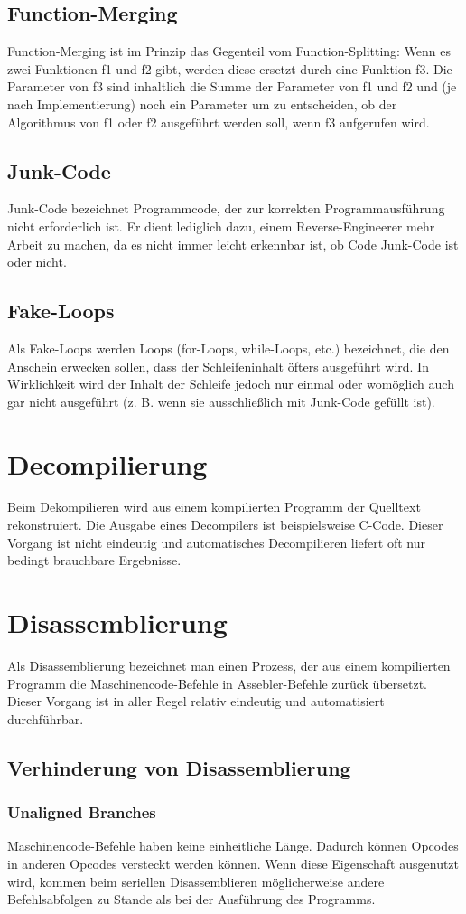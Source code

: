 \subsection{Function-Merging}
Function-Merging ist im Prinzip das Gegenteil vom Function-Splitting: Wenn es zwei Funktionen f1 und f2 gibt, werden diese ersetzt durch eine Funktion f3. Die Parameter von f3 sind inhaltlich die Summe der Parameter von f1 und f2 und (je nach Implementierung) noch ein Parameter um zu entscheiden, ob der Algorithmus von f1 oder f2 ausgeführt werden soll, wenn f3 aufgerufen wird.
\subsection{Junk-Code}
Junk-Code bezeichnet Programmcode, der zur korrekten Programmausführung nicht erforderlich ist. Er dient lediglich dazu, einem Reverse-Engineerer mehr Arbeit zu machen, da es nicht immer leicht erkennbar ist, ob Code Junk-Code ist oder nicht.
\subsection{Fake-Loops}
Als Fake-Loops werden Loops (for-Loops, while-Loops, etc.) bezeichnet, die den Anschein erwecken sollen, dass der Schleifeninhalt öfters ausgeführt wird. In Wirklichkeit wird der Inhalt der Schleife jedoch nur einmal oder womöglich auch gar nicht ausgeführt (z. B. wenn sie ausschließlich mit Junk-Code gefüllt ist).
\section{Decompilierung}
Beim Dekompilieren wird aus einem kompilierten Programm der Quelltext rekonstruiert. Die Ausgabe eines Decompilers ist beispielsweise C-Code. Dieser Vorgang ist nicht eindeutig und automatisches Decompilieren liefert oft nur bedingt brauchbare Ergebnisse.
\section{Disassemblierung}
Als Disassemblierung bezeichnet man einen Prozess, der aus einem kompilierten Programm die Maschinencode-Befehle in Assebler-Befehle zurück übersetzt. Dieser Vorgang ist in aller Regel relativ eindeutig und automatisiert durchführbar.
\subsection{Verhinderung von Disassemblierung}
\subsubsection{Unaligned Branches}
Maschinencode-Befehle haben keine einheitliche Länge. Dadurch können Opcodes in anderen Opcodes versteckt werden können. Wenn diese Eigenschaft ausgenutzt wird, kommen beim seriellen Disassemblieren möglicherweise andere Befehlsabfolgen zu Stande als bei der Ausführung des Programms. 
